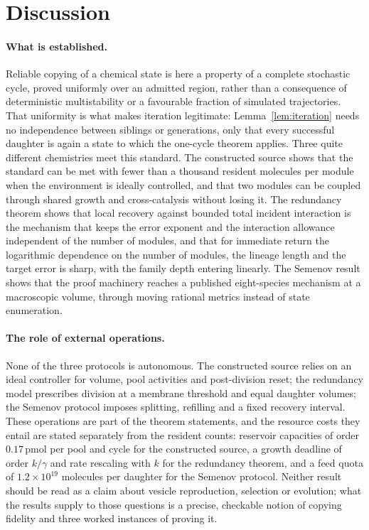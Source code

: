 \section{Discussion}\label{sec:discussion}

\paragraph{What is established.}
Reliable copying of a chemical state is here a property of a complete stochastic cycle, proved uniformly over an admitted region, rather than a consequence of deterministic multistability or a favourable fraction of simulated trajectories. That uniformity is what makes iteration legitimate: Lemma~\ref{lem:iteration} needs no independence between siblings or generations, only that every successful daughter is again a state to which the one-cycle theorem applies. Three quite different chemistries meet this standard. The constructed source shows that the standard can be met with fewer than a thousand resident molecules per module when the environment is ideally controlled, and that two modules can be coupled through shared growth and cross-catalysis without losing it. The redundancy theorem shows that local recovery against bounded total incident interaction is the mechanism that keeps the error exponent and the interaction allowance independent of the number of modules, and that for immediate return the logarithmic dependence on the number of modules, the lineage length and the target error is sharp, with the family depth entering linearly. The Semenov result shows that the proof machinery reaches a published eight-species mechanism at a macroscopic volume, through moving rational metrics instead of state enumeration.

\paragraph{The role of external operations.}
None of the three protocols is autonomous. The constructed source relies on an ideal controller for volume, pool activities and post-division reset; the redundancy model prescribes division at a membrane threshold and equal daughter volumes; the Semenov protocol imposes splitting, refilling and a fixed recovery interval. These operations are part of the theorem statements, and the resource costs they entail are stated separately from the resident counts: reservoir capacities of order $0.17$\,pmol per pool and cycle for the constructed source, a growth deadline of order $k/\gamma$ and rate rescaling with $k$ for the redundancy theorem, and a feed quota of $1.2\times10^{19}$ molecules per daughter for the Semenov protocol. Neither result should be read as a claim about vesicle reproduction, selection or evolution; what the results supply to those questions is a precise, checkable notion of copying fidelity and three worked instances of proving it.

